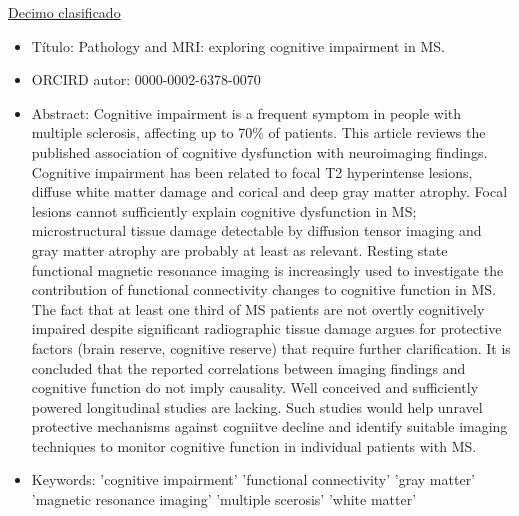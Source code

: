 \documentclass[size=a4, parskip=half, titlepage=false, toc=flat, toc=bib, 12pt, twoside]{scrartcl}
\theoremstyle{theorem-style}
\theoremstyle{definition-style}
\theoremstyle{remark-style}
\theoremstyle{example-style}
\theoremstyle{definition-style}
\theoremstyle{remark-style}
\begin{document}
\underline{Decimo clasificado}
\begin{itemize}
\item Título: Pathology and MRI: exploring cognitive impairment in MS.
\item ORCIRD autor: 0000-0002-6378-0070
\item Abstract: Cognitive impairment is a frequent symptom in people with multiple sclerosis, affecting up to 70\% of patients. This article reviews the published association of cognitive dysfunction with neuroimaging findings. Cognitive impairment has been related to focal T2 hyperintense lesions, diffuse white matter damage and corical and deep gray matter atrophy. Focal lesions cannot sufficiently explain cognitive dysfunction in MS; microstructural tissue damage detectable by diffusion tensor imaging and gray matter atrophy are probably at least as relevant. Resting state functional magnetic resonance imaging is increasingly used to investigate the contribution of functional connectivity changes to cognitive function in MS. The fact that at least one third of MS patients are not overtly cognitively impaired despite significant radiographic tissue damage argues for protective factors (brain reserve, cognitive reserve) that require further clarification. It is concluded that the reported correlations between imaging findings and cognitive function do not imply causality. Well conceived and sufficiently powered longitudinal studies are lacking. Such studies would help unravel protective mechanisms against cogniitve decline and identify suitable imaging techniques to monitor cognitive function in individual patients with MS.
\item Keywords: 'cognitive impairment' 'functional connectivity' 'gray matter'
  'magnetic resonance imaging' 'multiple scerosis' 'white matter'
\end{itemize}
\end{document}
